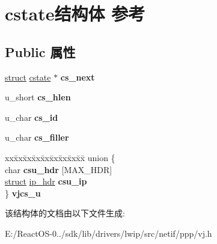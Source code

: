 \hypertarget{structcstate}{}\section{cstate结构体 参考}
\label{structcstate}
\subsection*{Public 属性}
\begin{DoxyCompactItemize}
\item 
\mbox{\label{structcstate_abcfcff5b8f99a0e4ba7473fcb6d6e04f}} 
\hyperlink{interfacestruct}{struct} \hyperlink{structcstate}{cstate} $\ast$ {\bfseries cs\+\_\+next}
\item 
\mbox{\label{structcstate_a68d57ea9ff4f992899c5df7b35e58337}} 
u\+\_\+short {\bfseries cs\+\_\+hlen}
\item 
\mbox{\label{structcstate_a4a5248f46119995d298c8867e3e48522}} 
u\+\_\+char {\bfseries cs\+\_\+id}
\item 
\mbox{\label{structcstate_a5db4a804868dfbc8c7c55a7ac68078b1}} 
u\+\_\+char {\bfseries cs\+\_\+filler}
\item 
\mbox{\label{structcstate_ab4f93522394b3dd2302542397657b41d}} 
\begin{tabbing}
xx\=xx\=xx\=xx\=xx\=xx\=xx\=xx\=xx\=\kill
union \{\\
\>char {\bfseries csu\_hdr} \mbox{[}MAX\_HDR\mbox{]}\\
\>\hyperlink{interfacestruct}{struct} \hyperlink{structip__hdr}{ip\_hdr} {\bfseries csu\_ip}\\
\} {\bfseries vjcs\_u}\\

\end{tabbing}\end{DoxyCompactItemize}


该结构体的文档由以下文件生成\+:\begin{DoxyCompactItemize}
\item 
E\+:/\+React\+O\+S-\/0../sdk/lib/drivers/lwip/src/netif/ppp/vj.\+h\end{DoxyCompactItemize}
